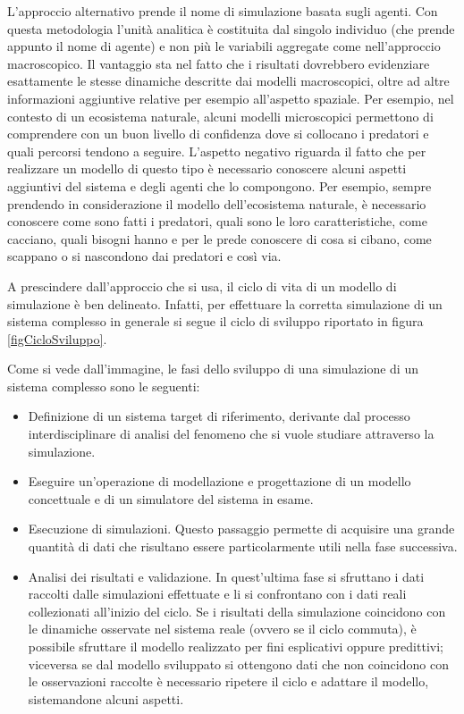 \documentclass[11pt]{article}
\begin{document}
L'approccio alternativo prende il nome di simulazione basata sugli agenti. Con questa metodologia l'unità analitica è costituita dal singolo individuo (che prende appunto il nome di agente) e non più le variabili aggregate come nell'approccio macroscopico. Il vantaggio sta nel fatto che i risultati dovrebbero evidenziare esattamente le stesse dinamiche descritte dai modelli macroscopici, oltre ad altre informazioni aggiuntive relative per esempio all'aspetto spaziale. Per esempio, nel contesto di un ecosistema naturale, alcuni modelli microscopici permettono di comprendere con un buon livello di confidenza dove si collocano i predatori e quali percorsi tendono a seguire. L'aspetto negativo riguarda il fatto che per realizzare un modello di questo tipo è necessario conoscere alcuni aspetti aggiuntivi del sistema e degli agenti che lo compongono. Per esempio, sempre prendendo in considerazione il modello dell'ecosistema naturale, è necessario conoscere come sono fatti i predatori, quali sono le loro caratteristiche, come cacciano, quali bisogni hanno e per le prede conoscere di cosa si cibano, come scappano o si nascondono dai predatori e così via. 

A prescindere dall'approccio che si usa, il ciclo di vita di un modello di simulazione è ben delineato. Infatti, per effettuare la corretta simulazione di un sistema complesso in generale si segue il ciclo di sviluppo riportato in figura \ref{figCicloSviluppo}.

Come si vede dall'immagine, le fasi dello sviluppo di una simulazione di un sistema complesso sono le seguenti: 
\begin{itemize}
    \item Definizione di un sistema target di riferimento, derivante dal processo interdisciplinare di analisi del fenomeno che si vuole studiare attraverso la simulazione.
    \item Eseguire un'operazione di modellazione e progettazione di un modello concettuale e di un simulatore del sistema in esame. 
    \item Esecuzione di simulazioni. Questo passaggio permette di acquisire una grande quantità di dati che risultano essere particolarmente utili nella fase successiva.
    \item Analisi dei risultati e validazione. In quest'ultima fase si sfruttano i dati raccolti dalle simulazioni effettuate e li si confrontano con i dati reali collezionati all'inizio del ciclo. Se i risultati della simulazione coincidono con le dinamiche osservate nel sistema reale (ovvero se il ciclo commuta), è possibile sfruttare il modello realizzato per fini esplicativi oppure predittivi; viceversa se dal modello sviluppato si ottengono dati che non coincidono con le osservazioni raccolte è necessario ripetere il ciclo e adattare il modello, sistemandone alcuni aspetti.
\end{itemize}
\end{document}
